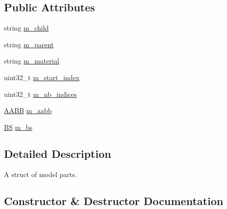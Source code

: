 \subsection*{Public Attributes}
\begin{DoxyCompactItemize}
\item 
string \hyperlink{structmage_1_1_model_part_abac2e9942c2d8015dc8b4f363729dc45}{m\+\_\+child}
\item 
string \hyperlink{structmage_1_1_model_part_ad4754bbb69d28885c09cef591d4d96c5}{m\+\_\+parent}
\item 
string \hyperlink{structmage_1_1_model_part_a606603dd01b895cb1aa91b51089bf27f}{m\+\_\+material}
\item 
uint32\+\_\+t \hyperlink{structmage_1_1_model_part_ac4f520d8284b4af7f20f94b116f7afed}{m\+\_\+start\+\_\+index}
\item 
uint32\+\_\+t \hyperlink{structmage_1_1_model_part_a3944ee7b1bf9a91fd87eefb1cf3c79bc}{m\+\_\+nb\+\_\+indices}
\item 
\hyperlink{structmage_1_1_a_a_b_b}{A\+A\+BB} \hyperlink{structmage_1_1_model_part_ab5b4cb74ac7d725896825b0f7ce8472a}{m\+\_\+aabb}
\item 
\hyperlink{structmage_1_1_b_s}{BS} \hyperlink{structmage_1_1_model_part_a551f6c340fa5547364e6cde9720ad856}{m\+\_\+bs}
\end{DoxyCompactItemize}


\subsection{Detailed Description}
A struct of model parts. 

\subsection{Constructor \& Destructor Documentation}
\hypertarget{structmage_1_1_model_part_a4a9443af884ad45625f894ae33eaac32}{}\label{structmage_1_1_model_part_a4a9443af884ad45625f894ae33eaac32} 
